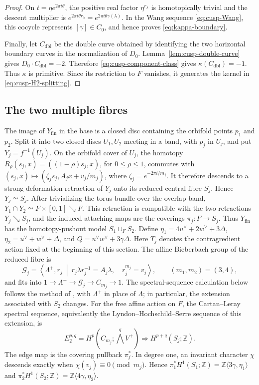 \documentclass[11pt]{article}
\theoremstyle{definition}
\theoremstyle{remark}
\numberwithin{equation}{section}
\begin{document}
\begin{proof}
On $t=\eta e^{2\pi i\theta}$, the positive real factor
$\eta^{r_\lambda}$ is homotopically trivial and the descent multiplier is
$e^{2\pi i\theta r_\lambda}=e^{2\pi i\theta\gamma(\lambda)}$.
In the Wang sequence \eqref{eq:cusp-Wang}, this cocycle represents
$[\gamma]\in C_0$, and hence proves
\eqref{eq:kappa-boundary}.

Finally, let $C_{\mathrm{dbl}}$ be the double curve obtained by identifying
the two horizontal boundary curves in the normalization of $D_0$.
Lemma~\ref{lem:cusp-double-curve} gives
$D_0\cdot C_{\mathrm{dbl}}=-2$.  Therefore
\eqref{eq:cusp-component-class} gives
$\kappa(C_{\mathrm{dbl}})=-1$.  Thus $\kappa$ is primitive.  Since its
restriction to $F$ vanishes, it generates the kernel in
\eqref{eq:cusp-H2-splitting}.
\end{proof}

\subsection{The two multiple fibres}

The image of $Y_{\mathrm{fin}}$ in the base is a closed disc containing
the orbifold points $p_1$ and $p_2$.  Split it into two closed discs
$U_1,U_2$ meeting in a band, with $p_j$ in
$U_j$, and put $Y_j=f^{-1}(U_j)$.  On the orbifold cover of
$U_j$, the homotopy
$R_\rho(s_j,x)=((1-\rho)s_j,x)$, for $0\leq\rho\leq1$,
commutes with
$(s_j,x)\mapsto(\zeta_js_j,A_jx+v_j/m_j)$, where
$\zeta_j=e^{-2\pi i/m_j}$.  It therefore descends to a
strong deformation retraction of $Y_j$ onto its reduced central fibre
$S_j$.  Hence
$Y_j\simeq S_j$.  After trivializing the torus bundle over the overlap
band, $Y_1\cap Y_2\simeq F\times[0,1]\searrow F$.
This retraction is compatible with the two retractions $Y_j\searrow S_j$,
and the induced attaching maps are the coverings
$\pi_j:F\to S_j$.  Thus $Y_{\mathrm{fin}}$ has the homotopy-pushout
model $S_1\cup_F S_2$.  Define
$\eta_1=4u^\vee+2w^\vee+3\Delta$,
$\eta_2=u^\vee+w^\vee+\Delta$, and
$Q=u^\vee w^\vee+3\gamma\Delta$.  Here $T_j$ denotes the
contragredient action fixed at the beginning of this section.
The affine Bieberbach group of the reduced fibre is
\[
 \mathcal G_j=
 \left\langle\Lambda^+,r_j\ \middle|\
 r_j\lambda r_j^{-1}=A_j\lambda,\quad r_j^{m_j}=v_j
 \right\rangle,
 \qquad (m_1,m_2)=(3,4),
\]
and fits into
$1\to\Lambda^+\to\mathcal G_j\to C_{m_j}\to1$.
The spectral-sequence calculation below follows the method of
\citep[Appendix~A, Lemma~A.4]{Alpoge2026}, with $\Lambda^+$ in place of
$\Lambda$; in particular, the extension associated with $S_2$ changes.
For the free affine action on $F$, the Cartan--Leray spectral sequence,
equivalently the Lyndon--Hochschild--Serre sequence of this extension, is
\begin{equation*}
 E_2^{p,q}=H^p\!\left(C_{m_j};\textstyle\bigwedge^qV^+\right)
 \Longrightarrow H^{p+q}(S_j;\mathbb Z).
\end{equation*}
The edge map is the covering pullback $\pi_j^*$.  In degree one, an
invariant character $\chi$ descends exactly when
$\chi(v_j)\equiv0\pmod{m_j}$.  Hence
$\pi_1^*H^1(S_1;\mathbb Z)=
\mathbb Z\langle3\gamma,\eta_1\rangle$ and
$\pi_2^*H^1(S_2;\mathbb Z)=
\mathbb Z\langle4\gamma,\eta_2\rangle$.
\end{document}
